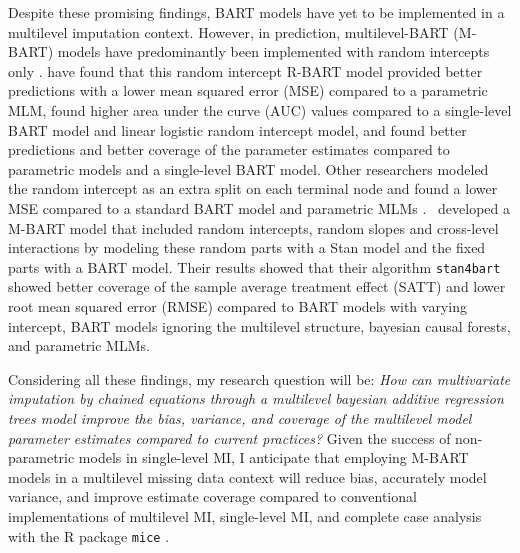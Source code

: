 \documentclass[3p,12pt,a4paper]{elsarticle}
\begin{document}
Despite these promising findings, BART models have yet to be implemented in a multilevel imputation context. However, in prediction, multilevel-BART (M-BART) models have predominantly been implemented with random intercepts only \citep{chen2020, wagner2020, tan2016, wundervald2022}. \citet{wagner2020} have found that this random intercept R-BART model provided better predictions with a lower mean squared error (MSE) compared to a parametric MLM, \citet{tan2016} found higher area under the curve (AUC) values compared to a single-level BART model and linear logistic random intercept model, and \citet{chen2020} found better predictions and better coverage of the parameter estimates compared to parametric models and a single-level BART model. Other researchers modeled the random intercept as an extra split on each terminal node and found a lower MSE compared to a standard BART model and parametric MLMs \citep{wundervald2022}.~\citet{dorie2022} developed a M-BART model that included random intercepts, random slopes and cross-level interactions by modeling these random parts with a Stan \citep{lee2017} model and the fixed parts with a BART model. Their results showed that their algorithm \texttt{stan4bart} showed better coverage of the sample average treatment effect (SATT) and lower root mean squared error (RMSE) compared to BART models with varying intercept, BART models ignoring the multilevel structure, bayesian causal forests, and parametric MLMs.



Considering all these findings, my research question will be: \textit{How can multivariate imputation by chained equations through a multilevel bayesian additive regression trees model improve the bias, variance, and coverage of the multilevel model parameter estimates compared to current practices?} Given the success of non-parametric models in single-level MI, I anticipate that employing M-BART models in a multilevel missing data context will reduce bias, accurately model variance, and improve estimate coverage compared to conventional implementations of multilevel MI, single-level MI, and complete case analysis with the R package \texttt{mice} \citep{buuren2011}. 
\end{document}
